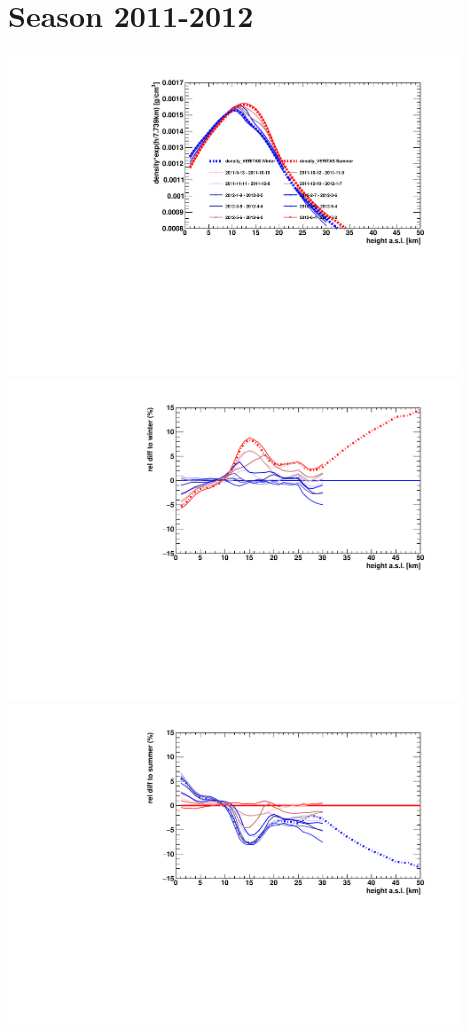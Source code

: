 \section*{Season 2011-2012}
\noindent\begin{minipage}{\textwidth}
\centering
\includegraphics[width=0.9\textwidth]{season-2011-2012-density.pdf}
\includegraphics[width=0.9\textwidth]{season-relativeWinter-2011-2012-density.pdf}
\includegraphics[width=0.9\textwidth]{season-relativeSummer-2011-2012-density.pdf}
\end{minipage}
